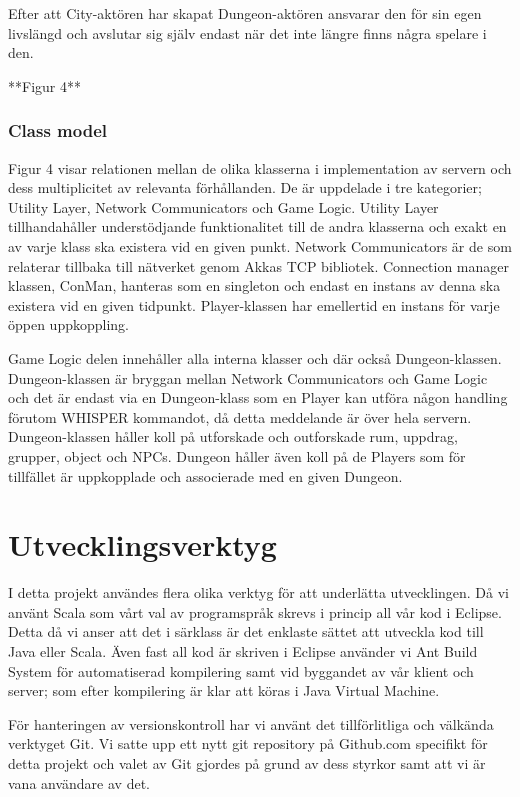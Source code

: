 \documentclass[a4paper]{article}
\begin{document}
Efter att City-aktören har skapat Dungeon-aktören ansvarar den för sin egen livslängd och avslutar sig själv endast när det inte längre finns några spelare i den.

**Figur 4**

\subsubsection{Class model}
Figur 4 visar relationen mellan de olika klasserna i implementation av servern och dess multiplicitet av relevanta förhållanden. 
De är uppdelade i tre kategorier; Utility Layer, Network Communicators och Game Logic. 
Utility Layer tillhandahåller understödjande funktionalitet till de andra klasserna och exakt en av varje klass ska existera vid en given punkt. 
Network Communicators är de som relaterar tillbaka till nätverket genom Akkas TCP bibliotek. Connection manager klassen, ConMan, hanteras som en singleton och endast en 
instans av denna ska existera vid en given tidpunkt. Player-klassen har emellertid en instans för varje öppen uppkoppling.

Game Logic delen innehåller alla interna klasser och där också Dungeon-klassen. Dungeon-klassen är bryggan mellan Network 
Communicators och Game Logic och det är endast via en Dungeon-klass som en Player kan utföra någon handling förutom WHISPER kommandot, 
då detta meddelande är över hela servern. Dungeon-klassen håller koll på utforskade och outforskade rum, uppdrag, grupper, object och NPCs. 
Dungeon håller även koll på de Players som för tillfället är uppkopplade och associerade med en given Dungeon.

\section{Utvecklingsverktyg}

I detta projekt användes flera olika verktyg för att underlätta utvecklingen. Då vi använt Scala som vårt val av programspråk skrevs i princip all vår kod i Eclipse. 
Detta då vi anser att det i särklass är det enklaste sättet att utveckla kod till Java eller Scala. Även fast all kod är skriven i Eclipse använder vi Ant Build System 
för automatiserad kompilering samt vid byggandet av vår klient och server; som efter kompilering är klar att köras i Java Virtual Machine. 

För hanteringen av versionskontroll har vi använt det tillförlitliga och välkända verktyget Git. Vi satte upp ett nytt git repository på Github.com specifikt för detta 
projekt och valet av Git gjordes på grund av dess styrkor samt att vi är vana användare av det.
\end{document}
